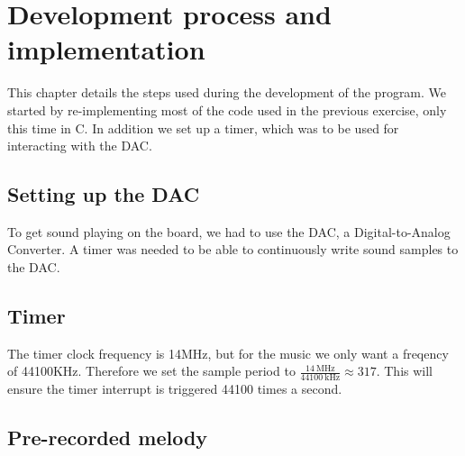 \section{Development process and implementation}
\label{chap:development_process}

This chapter details the steps used during the development of the program.
We started by re-implementing most of the code used in the previous exercise, only this time in C.
In addition we set up a timer, which was to be used for interacting with the DAC.


\subsection{Setting up the DAC}

To get sound playing on the board, we had to use the DAC, a Digital-to-Analog Converter.
A timer was needed to be able to continuously write sound samples to the DAC.

\subsection{Timer}

The timer clock frequency is 14MHz, but for the music we only want a freqency of 44100KHz.
Therefore we set the sample period to $ \frac{\SI{14}{\mega\hertz}}{\SI{44100}{\kilo\hertz}} \approx 317 $.
This will ensure the timer interrupt is triggered 44100 times a second.



\subsection{Pre-recorded melody}

